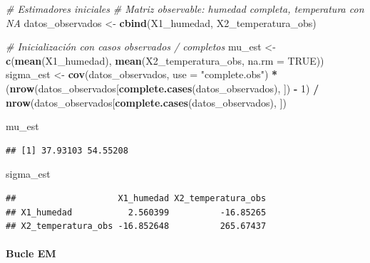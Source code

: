 \documentclass[
]{article}
\newenvironment{Shaded}{\begin{snugshade}}{\end{snugshade}}
\newcommand{\AttributeTok}[1]{\textcolor[rgb]{0.13,0.29,0.53}{#1}}
\newcommand{\CommentTok}[1]{\textcolor[rgb]{0.56,0.35,0.01}{\textit{#1}}}
\newcommand{\ConstantTok}[1]{\textcolor[rgb]{0.56,0.35,0.01}{#1}}
\newcommand{\DecValTok}[1]{\textcolor[rgb]{0.00,0.00,0.81}{#1}}
\newcommand{\FunctionTok}[1]{\textcolor[rgb]{0.13,0.29,0.53}{\textbf{#1}}}
\newcommand{\NormalTok}[1]{#1}
\newcommand{\OtherTok}[1]{\textcolor[rgb]{0.56,0.35,0.01}{#1}}
\newcommand{\SpecialCharTok}[1]{\textcolor[rgb]{0.81,0.36,0.00}{\textbf{#1}}}
\newcommand{\StringTok}[1]{\textcolor[rgb]{0.31,0.60,0.02}{#1}}
\begin{document}
\begin{Shaded}
\begin{Highlighting}[]
\CommentTok{\# Estimadores iniciales}
\CommentTok{\# Matriz observable: humedad completa, temperatura con NA}
\NormalTok{datos\_observados }\OtherTok{\textless{}{-}} \FunctionTok{cbind}\NormalTok{(X1\_humedad, X2\_temperatura\_obs)}

\CommentTok{\# Inicialización con casos observados / completos}
\NormalTok{mu\_est }\OtherTok{\textless{}{-}} \FunctionTok{c}\NormalTok{(}\FunctionTok{mean}\NormalTok{(X1\_humedad), }\FunctionTok{mean}\NormalTok{(X2\_temperatura\_obs, }\AttributeTok{na.rm =} \ConstantTok{TRUE}\NormalTok{))}
\NormalTok{sigma\_est }\OtherTok{\textless{}{-}} \FunctionTok{cov}\NormalTok{(datos\_observados, }\AttributeTok{use =} \StringTok{"complete.obs"}\NormalTok{) }\SpecialCharTok{*}\NormalTok{ (}\FunctionTok{nrow}\NormalTok{(datos\_observados[}\FunctionTok{complete.cases}\NormalTok{(datos\_observados), ]) }\SpecialCharTok{{-}} \DecValTok{1}\NormalTok{) }\SpecialCharTok{/} \FunctionTok{nrow}\NormalTok{(datos\_observados[}\FunctionTok{complete.cases}\NormalTok{(datos\_observados), ])}


\NormalTok{mu\_est}
\end{Highlighting}
\end{Shaded}

\begin{verbatim}
## [1] 37.93103 54.55208
\end{verbatim}

\begin{Shaded}
\begin{Highlighting}[]
\NormalTok{sigma\_est}
\end{Highlighting}
\end{Shaded}

\begin{verbatim}
##                    X1_humedad X2_temperatura_obs
## X1_humedad           2.560399          -16.85265
## X2_temperatura_obs -16.852648          265.67437
\end{verbatim}

\paragraph{Bucle EM}\label{bucle-em}
\end{document}
